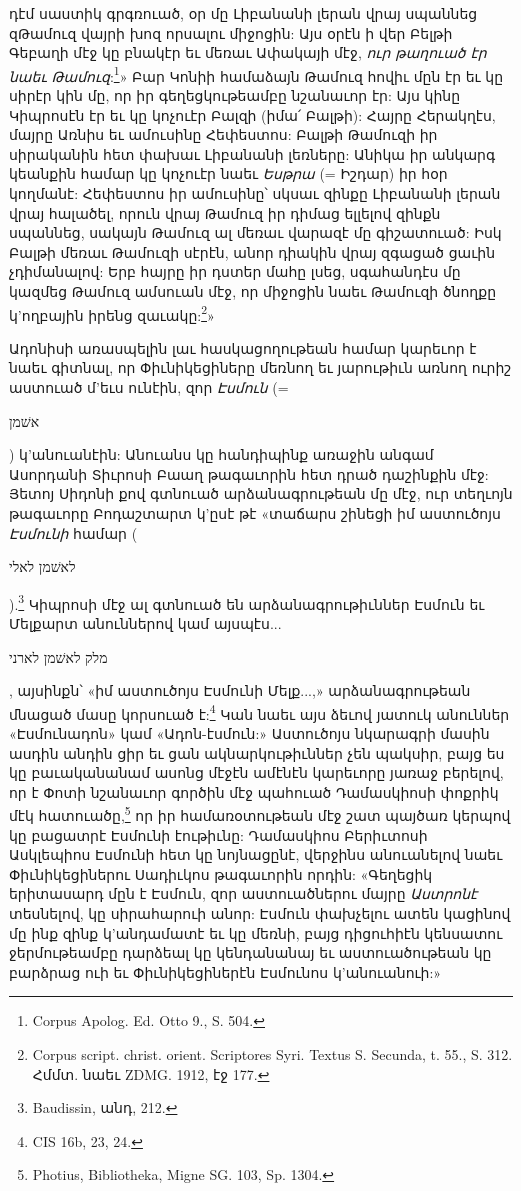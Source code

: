 \documentclass{article}
\begin{document}
{դէմ սաստիկ գրգռուած, օր մը Լիբանանի լերան վրայ սպաննեց զԹամուզ վայրի խոզ որսալու միջոցին: Այս օրէն ի վեր Բելթի Գեբաղի մէջ կը բնակէր եւ մեռաւ Ափակայի մէջ, \emph{ուր թաղուած էր նաեւ Թամուզ}:\footnote{Corpus Apolog. Ed. Otto 9., S. 504.}» Բար Կոնիի համաձայն Թամուզ հովիւ մըն էր եւ կը սիրէր կին մը, որ իր գեղեցկութեամբը նշանաւոր էր: Այս կինը Կիպրոսէն էր եւ կը կոչուէր Բալզի (իմա՛ Բալթի): Հայրը Հերակղէս, մայրը Առնիս եւ ամուսինը Հեփեստոս: Բալթի Թամուզի իր սիրականին հետ փախաւ Լիբանանի լեռները: Անիկա իր անկարգ կեանքին համար կը կոչուէր նաեւ \emph{Եսթրա} (= Իշդար) իր հօր կողմանէ: Հեփեստոս իր ամուսինը՝ սկսաւ զինքը Լիբանանի լերան վրայ հալածել, որուն վրայ Թամուզ իր դիմաց ելլելով զինքն սպաննեց, սակայն Թամուզ ալ մեռաւ վարազէ մը գիշատուած: Իսկ Բալթի մեռաւ Թամուզի սէրէն, անոր դիակին վրայ զգացած ցաւին չդիմանալով: Երբ հայրը իր դստեր մահը լսեց, սգահանդէս մը կազմեց Թամուզ ամսուան մէջ, որ միջոցին նաեւ Թամուզի ծնողքը կ'ողբային իրենց զաւակը:\footnote{Corpus script. christ. orient. Scriptores Syri. Textus S. Secunda, t. 55., S. 312. Հմմտ. նաեւ ZDMG. 1912, էջ 177.}»

Ադոնիսի առասպելին լաւ հասկացողութեան համար կարեւոր է նաեւ գիտնալ, որ Փիւնիկեցիները մեռնող եւ յարութիւն առնող ուրիշ աստուած մ'եւս ունէին, զոր \emph{Էսմուն} (= \begin{hebrewfont}אשׁמן\end{hebrewfont}) կ'անուանէին: Անուանս կը հանդիպինք առաջին անգամ Ասորդանի Տիւրոսի Բաաղ թագաւորին հետ դրած դաշինքին մէջ: Յետոյ Սիդոնի քով գտնուած արձանագրութեան մը մէջ, ուր տեղւոյն թագաւորը Բոդաշտարտ կ'ըսէ թէ «տաճարս շինեցի իմ աստուծոյս \emph{Էսմունի} համար (\begin{hebrewfont}לאשׁמן לאלי\end{hebrewfont}).\footnote{Baudissin, անդ, 212.} Կիպրոսի մէջ ալ գտնուած են արձանագրութիւններ Էսմուն եւ Մելքարտ անուններով կամ այսպէս... \begin{hebrewfont}מלק לאשׁמן לארני\end{hebrewfont}, այսինքն՝ «իմ աստուծոյս Էսմունի Մելք...,» արձանագրութեան մնացած մասը կորսուած է:\footnote{CIS 16b, 23, 24.} Կան նաեւ այս ձեւով յատուկ անուններ «Էսմունադոն» կամ «Ադոն-էսմուն:» Աստուծոյս նկարագրի մասին ասդին անդին ցիր եւ ցան ակնարկութիւններ չեն պակսիր, բայց ես կը բաւականանամ ասոնց մէջէն ամէնէն կարեւորը յառաջ բերելով, որ է Փոտի նշանաւոր գործին մէջ պահուած Դամասկիոսի փոքրիկ մէկ հատուածը,\footnote{Photius, Bibliotheka, Migne SG. 103, Sp. 1304.} որ իր համառօտութեան մէջ շատ պայծառ կերպով կը բացատրէ Էսմունի էութիւնը: Դամասկիոս Բերիւտոսի Ասկլեպիոս Էսմունի հետ կը նոյնացընէ, վերջինս անուանելով նաեւ Փիւնիկեցիներու Սադիւկոս թագաւորին որդին: «Գեղեցիկ երիտասարդ մըն է Էսմուն, զոր աստուածներու մայրը \emph{Աստրոնէ} տեսնելով, կը սիրահարուի անոր: Էսմուն փախչելու ատեն կացինով մը ինք զինք կ'անդամատէ եւ կը մեռնի, բայց դիցուհիէն կենսատու ջերմութեամբը դարձեալ կը կենդանանայ եւ աստուածութեան կը բարձրաց ուի եւ Փիւնիկեցիներէն Էսմունոս կ'անուանուի:»

}
\end{document}
